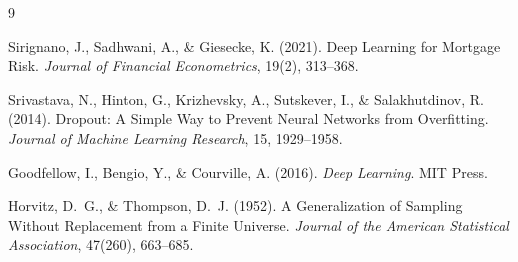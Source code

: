 \documentclass[11pt,a4paper]{article}
\begin{document}
\begin{thebibliography}{9}

Sirignano, J., Sadhwani, A., \& Giesecke, K. (2021).
\newblock Deep Learning for Mortgage Risk.
\newblock \emph{Journal of Financial Econometrics}, 19(2), 313--368.

Srivastava, N., Hinton, G., Krizhevsky, A., Sutskever, I., \& Salakhutdinov, R. (2014).
\newblock Dropout: A Simple Way to Prevent Neural Networks from Overfitting.
\newblock \emph{Journal of Machine Learning Research}, 15, 1929--1958.

Goodfellow, I., Bengio, Y., \& Courville, A. (2016).
\newblock \emph{Deep Learning}. MIT Press.

Horvitz, D.~G., \& Thompson, D.~J. (1952).
\newblock A Generalization of Sampling Without Replacement from a Finite Universe.
\newblock \emph{Journal of the American Statistical Association}, 47(260), 663--685.

\end{thebibliography}
\end{document}
